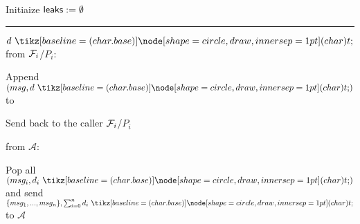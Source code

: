 \begin{bbox}[title={\textbf{Wrapper} $\mathcal{W}_{\msf{leak}}$} ]

Initiaize ${\mathsf {leaks}} := \emptyset$

\vspace{2mm} \hrule \vspace{2mm}

\OnInput {} $d \token$ from $\mathcal{F}_i$/$P_i$:

	\begin{ritemize}
		\item Append $(msg, d \token)$ to 
		\item Send  back to the caller $\mathcal{F}_i$/$P_i$
	\end{ritemize}

\OnInput {} from $\mathcal{A}$:

	\begin{ritemize}
		\item Pop all $(msg_i, d_i \token)$ and send $\{msg_1,...,msg_n\}, \sum_{i=0}^{n} d_i \token$ to $\mathcal{A}$
	\end{ritemize}

\end{bbox}
